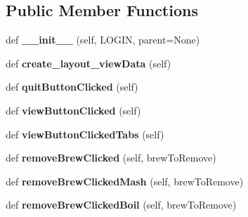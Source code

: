 \subsection*{Public Member Functions}
\begin{DoxyCompactItemize}
\item 
\mbox{\label{classview_data_window_1_1_view_data_window_aaf6aacd3a1e4e4db65dcf8a60de2d743}} 
def {\bfseries \+\_\+\+\_\+init\+\_\+\+\_\+} (self, L\+O\+G\+IN, parent=None)
\item 
\mbox{\label{classview_data_window_1_1_view_data_window_a54282c1b800a0f48b6803ede1bb54fca}} 
def {\bfseries create\+\_\+layout\+\_\+view\+Data} (self)
\item 
\mbox{\label{classview_data_window_1_1_view_data_window_a6334132ee01c22f19feaa7d28507d484}} 
def {\bfseries quit\+Button\+Clicked} (self)
\item 
\mbox{\label{classview_data_window_1_1_view_data_window_ae21ebe5cc698bedd63b8781bfc9bcf49}} 
def {\bfseries view\+Button\+Clicked} (self)
\item 
\mbox{\label{classview_data_window_1_1_view_data_window_a9e644c71d10c9cdd141a0160d28e86ad}} 
def {\bfseries view\+Button\+Clicked\+Tabs} (self)
\item 
\mbox{\label{classview_data_window_1_1_view_data_window_a74e55a734d9ebed83b129c94de858603}} 
def {\bfseries remove\+Brew\+Clicked} (self, brew\+To\+Remove)
\item 
\mbox{\label{classview_data_window_1_1_view_data_window_a75470bde117369d760f4e388cff25d63}} 
def {\bfseries remove\+Brew\+Clicked\+Mash} (self, brew\+To\+Remove)
\item 
\mbox{\label{classview_data_window_1_1_view_data_window_a5f78d57c4dc8fb4724a8e97f603a8e17}} 
def {\bfseries remove\+Brew\+Clicked\+Boil} (self, brew\+To\+Remove)
\item 

\end{DoxyCompactItemize}
